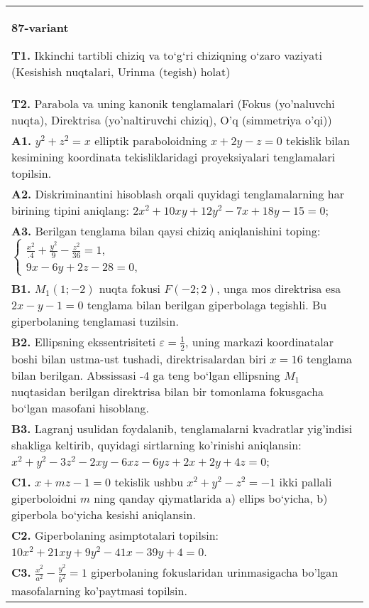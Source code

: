 \documentclass{article}
\begin{document}
\begin{tabular}{m{17cm}}
\textbf{87-variant}
\newline

\textbf{T1.} Ikkinchi tartibli chiziq va to‘g‘ri chiziqning o‘zaro vaziyati (Kesishish nuqtalari, Urinma (tegish) holat) \\
\textbf{T2.} Parabola va uning kanonik tenglamalari (Fokus (yo’naluvchi nuqta), Direktrisa (yo’naltiruvchi chiziq), O’q (simmetriya o’qi)) \\
\textbf{A1.} $y^2+z^2=x$ elliptik paraboloidning $x+2 y-z=0$ tekislik bilan kesimining koordinata tekisliklaridagi proyeksiyalari tenglamalari topilsin. \\
\textbf{A2.} Diskriminantini hisoblash orqali quyidagi tenglamalarning har birining tipini aniqlang: $2 x^2+10 x y+12 y^2-7 x+18 y-15=0$; \\
\textbf{A3.} Berilgan tenglama bilan qaysi chiziq aniqlanishini toping: $\left\{\begin{array}{l}\frac{x^2}{.4}+\frac{y^2}{9}-\frac{z^2}{36}=1, \\ 9 x-6 y+2 z-28=0,\end{array}\right.$ \\
\textbf{B1.} $M_1 (1;-2) $ nuqta fokusi $F (-2; 2) $, unga mos direktrisa esa $2x-y-1=0$ tenglama bilan berilgan giperbolaga tegishli. Bu giperbolaning tenglamasi tuzilsin. \\
\textbf{B2.} Ellipsning ekssentrisiteti $\varepsilon=\frac{1}{2}$, uning markazi koordinatalar boshi bilan ustma-ust tushadi, direktrisalardan biri $x=16$ tenglama bilan berilgan. Abssissasi -4 ga teng bo‘lgan ellipsning $M_1$ nuqtasidan berilgan direktrisa bilan bir tomonlama fokusgacha bo‘lgan masofani hisoblang. \\
\textbf{B3.} Lagranj usulidan foydalanib, tenglamalarni kvadratlar yig'indisi shakliga keltirib, quyidagi sirtlarning ko'rinishi aniqlansin: $x^2+y^2-3 z^2-2 x y-6 x z-6 y z+2 x+2 y+4 z=0$; \\
\textbf{C1.} $x+m z-1=0$ tekislik ushbu $x^2+y^2-z^2=-1$ ikki pallali giperboloidni $m$ ning qanday qiymatlarida a) ellips bo‘yicha, b) giperbola bo‘yicha kesishi aniqlansin. \\
\textbf{C2.} Giperbolaning asimptotalari topilsin: $10 x^2+21 x y+9 y^2-41 x-39 y+4=0$. \\
\textbf{C3.} $\frac{x^2}{a^2}-\frac{y^2}{b^2}=1$ giperbolaning fokuslaridan urinmasigacha bo'lgan masofalarning ko'paytmasi topilsin. \\

\end{tabular}
\vspace{1cm}
\end{document}
